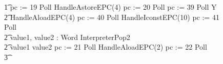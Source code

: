 \begin{figure}[p!]
\begin{circus}
    \t1 pc := 19 \circseq Poll \circseq HandleAstoreEPC(4) \circseq pc := 20 \circseq Poll \circseq pc := 39 \circseq  Poll \circseq \circmu Y \circspot \\
    \t2 HandleAloadEPC(4) \circseq pc := 40 \circseq Poll \circseq HandleIconstEPC(10) \circseq  pc := 41 \circseq Poll \circseq \\
    \t2 \circvar value1, value2 : Word \circspot InterpreterPop2 \circseq \\
    \t2 \circif value1 \leq value2 \circthen pc := 21 \circseq Poll \circseq HandleAloadEPC(2) \circseq pc := 22 \circseq Poll \circseq \\
    \t3 {} \cdots {} \\

\end{circus}
\end{figure}
